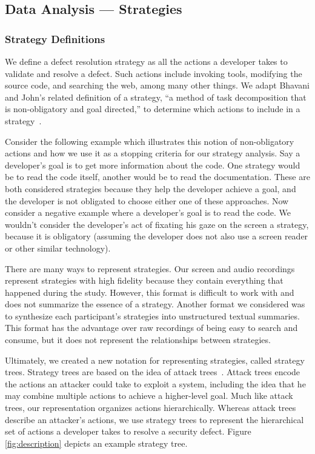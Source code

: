 \documentclass[10pt,journal,compsoc]{IEEEtran}
\begin{document}
\subsection{Data Analysis --- Strategies}
\label{sec:strategyAnalysis}

\subsubsection{Strategy Definitions}
\label{sec:stratDef}
We define a defect resolution strategy as all the actions a developer takes to validate and resolve a defect. 
Such actions include invoking tools, modifying the source code, and searching the web, among many other things.
We adapt Bhavani and John's related definition of a strategy, ``a method of task
decomposition that is non-obligatory and goal directed,'' to determine which actions to include in a strategy~\cite{bhavnani1997sufficient}.

Consider the following example which illustrates this notion of non-obligatory actions and how we use it as a stopping criteria for our strategy analysis.
Say a developer's goal is to get more information about the code. 
One strategy would be to read the code itself, another would be to read the documentation.
These are both considered strategies because they help the developer achieve a goal, and the developer is not obligated to choose either one of these approaches.
Now consider a negative example where a developer's goal is to read the code.
We wouldn't consider the developer's act of fixating  his gaze on the screen a strategy, because it is obligatory (assuming the developer does not also use a screen reader or other similar technology).

There are many ways to represent strategies. 
Our screen and audio recordings represent strategies with high fidelity because they contain everything that happened during the study.
However, this format is difficult to work with and does not summarize the essence of a strategy.
Another format we considered was to synthesize each participant's strategies into unstructured textual summaries.
This format has the advantage over raw recordings of being easy to search and consume, but it does not represent the relationships between strategies.

Ultimately, we created a new notation for representing strategies, called strategy trees.
Strategy trees are based on the idea of attack trees~\cite{attackTrees}. 
Attack trees encode the actions an attacker could take to exploit a system, including the idea that he may combine multiple actions to achieve a higher-level goal. 
Much like attack trees, our representation organizes actions hierarchically.
Whereas attack trees describe an attacker's actions, we use strategy trees to represent the hierarchical set of actions a developer takes to resolve a security defect. 
Figure \ref{fig:description} depicts an example strategy tree.
\end{document}
